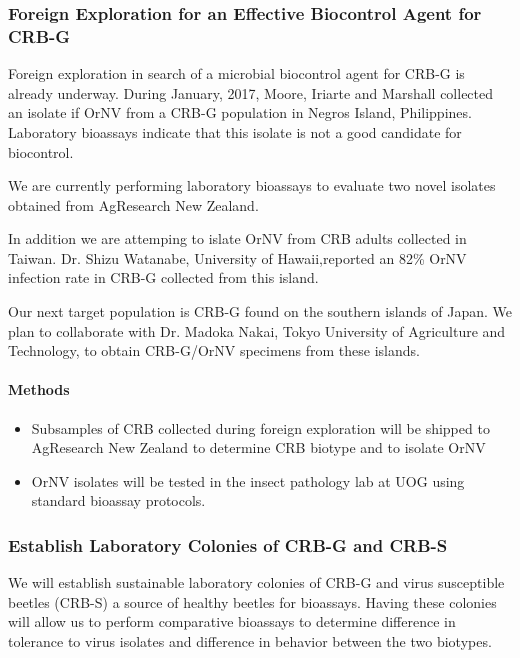 \documentclass[14pt,english,letterpaper]{scrartcl}
\begin{document}
\subsubsection{Foreign Exploration for an Effective Biocontrol Agent for CRB-G}

Foreign exploration in search of a microbial biocontrol agent for CRB-G is already underway.
During January, 2017, Moore, Iriarte and Marshall collected an isolate if OrNV from a CRB-G population in Negros Island, Philippines. Laboratory bioassays indicate that this isolate is not a good candidate for biocontrol.

We are currently performing laboratory bioassays to evaluate two novel isolates obtained from AgResearch New Zealand.

In addition we are attemping to islate OrNV from CRB adults collected in Taiwan. Dr. Shizu Watanabe, University of Hawaii,reported an 82\% OrNV infection rate in CRB-G collected from this island.

Our next target population is CRB-G found on the southern islands of Japan. We plan to collaborate with Dr. Madoka Nakai, Tokyo University of Agriculture and Technology, to obtain CRB-G/OrNV specimens from these islands.

\paragraph{Methods}

\begin{itemize}
	\item Subsamples of CRB collected during foreign exploration will be shipped to AgResearch New Zealand to determine CRB biotype and to isolate OrNV
	\item OrNV isolates will be tested in the insect pathology lab at UOG using standard bioassay protocols.
\end{itemize}

\subsubsection{Establish Laboratory Colonies of CRB-G and CRB-S}

We will establish sustainable laboratory colonies of CRB-G and virus susceptible beetles (CRB-S) a source of healthy beetles for bioassays. Having these colonies will allow us to perform comparative bioassays to determine difference in tolerance to virus isolates and difference in behavior between the two biotypes. 
\end{document}
